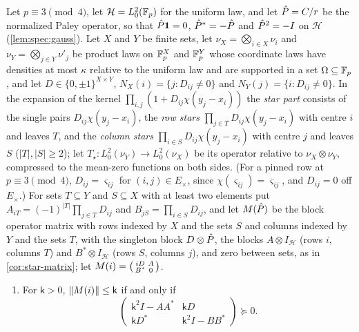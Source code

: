 \begin{proposition}\label{prop:conditional-star}
Let $p\equiv3\pmod4$, let $\mathcal H=L^2_0(\mathbb F_p)$ for the uniform law, and let
$\hat P=C/r$ be the normalized Paley operator, so that $\hat P\mathbf 1=0$, $\hat P^*=-\hat P$
and $\hat P^2=-I$ on $\mathcal H$ (\cref{lem:spec:gauss}). Let $X$ and $Y$ be finite
sets, let $\nu_X=\bigotimes_{i\in X}\nu_i$ and $\nu_Y=\bigotimes_{j\in Y}\nu'_j$ be
product laws on $\mathbb F_p^X$ and $\mathbb F_p^Y$ whose coordinate laws have densities at most
$\kappa$ relative to the uniform law and are supported in a set $\Omega\subseteq\mathbb F_p$,
and let $D\in\{0,\pm1\}^{X\times Y}$, $N_X(i)=\{j:D_{ij}\ne0\}$ and
$N_Y(j)=\{i:D_{ij}\ne0\}$. In the expansion of the kernel
$\prod_{i,j}(1+D_{ij}\chi(y_j-x_i))$ the \emph{star part} consists of the single pairs
$D_{ij}\chi(y_j-x_i)$, the \emph{row stars} $\prod_{j\in T}D_{ij}\chi(y_j-x_i)$ with
centre $i$ and leaves $T$, and the \emph{column stars}
$\prod_{i\in S}D_{ij}\chi(y_j-x_i)$ with centre $j$ and leaves $S$ ($|T|,|S|\ge2$);
let $T_\star\colon L^2_0(\nu_Y)\to L^2_0(\nu_X)$ be its operator relative to
$\nu_X\otimes\nu_Y$, compressed to the mean-zero functions on both sides. (For a
pinned row at $p\equiv3\pmod4$, $D_{ij}=\varsigma_{ij}$ for
$(i,j)\in E_\times$, since $\chi(\varsigma_{ij})=\varsigma_{ij}$, and
$D_{ij}=0$ off $E_\times$.)
For sets $T\subseteq Y$ and $S\subseteq X$ with at least two elements put
$A_{iT}=(-1)^{|T|}\prod_{j\in T}D_{ij}$ and $B_{jS}=\prod_{i\in S}D_{ij}$, and let
$M(\hat P)$ be the block operator matrix with rows indexed by $X$ and the sets $S$ and
columns indexed by $Y$ and the sets $T$, with the singleton block $D\otimes\hat P$, the
blocks $A\otimes I_{\mathcal H}$ (rows $i$, columns $T$) and $B^*\otimes I_{\mathcal H}$
(rows $S$, columns $j$), and zero between sets, as in \cref{cor:star-matrix}; let
$M(i)=\begin{psmallmatrix}iD&A\\B^*&0\end{psmallmatrix}$.
\begin{enumerate}[label=\textup{(\alph*)}]
\item For $\mathsf k>0$, $\left\|M(i)\right\|\le\mathsf k$ if and only if
 \begin{equation}\label{eq:conditional-star-gate}
  \begin{pmatrix}\mathsf k^2I-AA^*&\mathsf kD\\ \mathsf kD^*&\mathsf k^2I-BB^*\end{pmatrix}
  \succeq0 .
 \end{equation}

\end{enumerate}
\end{proposition}
